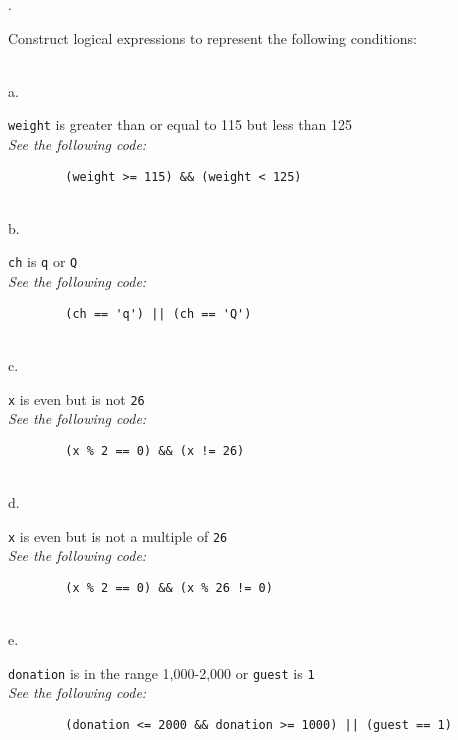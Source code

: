 \documentclass{amsart}
\begin{document}
. 
\begin{minipage}[t]{11.5 cm}
	Construct logical expressions to represent the following conditions:
\end{minipage} \\[1ex]
\phantom{1. }a. 
\begin{minipage}[t]{11.5 cm}
	\texttt{weight} is greater than or equal to 115 but less than 125 \\[1ex]
	{\slshape See the following code:}	
	\begin{verbatim}
		(weight >= 115) && (weight < 125)
	\end{verbatim}
	{} %
\end{minipage} \\[1ex]
\phantom{1. }b. 
\begin{minipage}[t]{11.5 cm}
	\texttt{ch} is \texttt{q} or \texttt{Q} \\[1ex]
	{\slshape See the following code:}
	\begin{verbatim}
		(ch == 'q') || (ch == 'Q')
	\end{verbatim}
	{} %
\end{minipage} \\[1ex]
\phantom{1. }c. 
\begin{minipage}[t]{11.5 cm}
	\texttt{x} is even but is not \texttt{26} \\[1ex]
	{\slshape See the following code:}
	\begin{verbatim}
		(x % 2 == 0) && (x != 26)
	\end{verbatim}
	{} %
\end{minipage} \\[1ex]
\phantom{1. }d. 
\begin{minipage}[t]{11.5 cm}
	\texttt{x} is even but is not a multiple of \texttt{26} \\[1ex]
	{\slshape See the following code:}
	\begin{verbatim}
		(x % 2 == 0) && (x % 26 != 0)
	\end{verbatim}
	{} %
\end{minipage} \\[1ex]
\phantom{1. }e. 
\begin{minipage}[t]{11.5 cm}
	\texttt{donation} is in the range 1,000-2,000 or \texttt{guest} is \texttt{1} \\[1ex]
	{\slshape See the following code:}
	\begin{verbatim}
		(donation <= 2000 && donation >= 1000) || (guest == 1)
	\end{verbatim}
	{} %
\end{minipage} \\[1ex]
\end{document}
